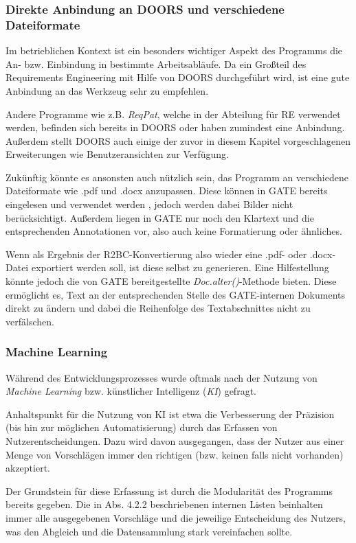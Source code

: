\documentclass[12pt]{report}
\begin{document}
\subsubsection{Direkte Anbindung an DOORS und verschiedene Dateiformate}
Im betrieblichen Kontext ist ein besonders wichtiger Aspekt des Programms die An- bzw. Einbindung in bestimmte Arbeitsabläufe. Da ein Großteil des Requirements Engineering mit Hilfe von DOORS durchgeführt wird, ist eine gute Anbindung an das Werkzeug sehr zu empfehlen. 

Andere Programme wie z.B. \textit{ReqPat}, welche in der Abteilung für RE verwendet werden, befinden sich bereits in DOORS oder haben zumindest eine Anbindung. Außerdem stellt DOORS auch einige der zuvor in diesem Kapitel vorgeschlagenen Erweiterungen wie Benutzeransichten zur Verfügung. 

Zukünftig könnte es ansonsten auch nützlich sein, das Programm an verschiedene Dateiformate wie .pdf und .docx anzupassen. Diese können in GATE bereits eingelesen und verwendet werden \cite{rs18}, jedoch werden dabei Bilder nicht berücksichtigt. Außerdem liegen in GATE nur noch den Klartext und die entsprechenden Annotationen vor, also auch keine Formatierung oder ähnliches. 

Wenn als Ergebnis der R2BC-Konvertierung also wieder eine .pdf- oder .docx-Datei exportiert werden soll, ist diese selbst zu generieren. Eine Hilfestellung könnte jedoch die von GATE bereitgestellte \textit{Doc.alter()}-Methode bieten. Diese ermöglicht es, Text an der entsprechenden Stelle des GATE-internen Dokuments direkt zu ändern und dabei die Reihenfolge des Textabschnittes nicht zu verfälschen.

\subsubsection{Machine Learning}
Während des Entwicklungsprozesses wurde oftmals nach der Nutzung von \textit{Machine Learning} bzw. künstlicher Intelligenz (\textit{KI}) gefragt.

Anhaltspunkt für die Nutzung von KI ist etwa die Verbesserung der Präzision (bis hin zur möglichen Automatisierung) durch das Erfassen von Nutzerentscheidungen. Dazu wird davon ausgegangen, dass der Nutzer aus einer Menge von Vorschlägen immer den richtigen (bzw. keinen falls nicht vorhanden) akzeptiert. 

Der Grundstein für diese Erfassung ist durch die Modularität des Programms bereits gegeben. Die in Abs. 4.2.2 beschriebenen internen Listen beinhalten immer alle ausgegebenen Vorschläge und die jeweilige Entscheidung des Nutzers, was den Abgleich und die Datensammlung stark vereinfachen sollte. 
\end{document}

